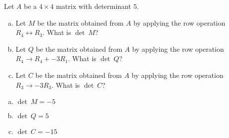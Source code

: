 
\begin{exerciseStatement}


Let \(A\) be a \(4 \times 4\) matrix with determinant \( 5 \).


\begin{enumerate}[(a)]
\item Let \(M\) be the matrix obtained from \(A\) by applying the row operation \( R_4 \leftrightarrow R_3 \). What is \(\operatorname{det}\ M\)?
\item Let \(Q\) be the matrix obtained from \(A\) by applying the row operation \( R_4 \to R_4 + -3R_1 \). What is \(\operatorname{det}\ Q\)?
\item Let \(C\) be the matrix obtained from \(A\) by applying the row operation \( R_3 \to -3R_3 \). What is \(\operatorname{det}\ C\)?
\end{enumerate}
    
\end{exerciseStatement}
    
\begin{exerciseAnswer} 

\begin{enumerate}[(a)]
\item \(\operatorname{det}\ M= -5 \)
\item \(\operatorname{det}\ Q= 5 \)
\item \(\operatorname{det}\ C= -15 \)
\end{enumerate}
    
\end{exerciseAnswer}
    
